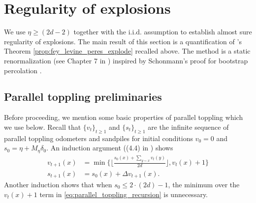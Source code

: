 \documentclass[aap]{imsart}
\newcommand{\Z}{\mathbb{Z}}
\begin{document}






\section{Regularity of explosions} \label{sec:fast_explosions}
We use $\eta \geq (2 d- 2)$ together with the i.i.d. assumption to establish almost sure regularity of explosions. 
The main result of this section is a quantification of \cite{fey2010growth}'s Theorem \ref{prop:fey_levine_peres_explode} recalled above. 
The method is a static renormalization (see Chapter 7 in \cite{grimmett2013percolation}) inspired by Schonmann's proof for bootstrap percolation \cite{schonmann1992behavior}. 



\subsection{Parallel toppling preliminaries}
Before proceeding, we mention some basic properties of parallel toppling which we use below. Recall that $\{v_t\}_{t }$ and $\{s_t\}_{t }$ are the infinite sequence of parallel toppling odometers and sandpiles for initial conditions $v_0 = 0$ and  $s_0 = \eta + M_{\eta}  \delta_0$.
An induction argument ((4.4) in \cite{babai2007sandpile}) shows
\begin{equation} \label{eq:parallel_toppling_recursion}
\begin{aligned}
v_{t+1}(x) &= \min \{ \lfloor \frac{ s_0(x) + \sum_{y \sim x} v_{t}(y)}{2 d} \rfloor, v_t(x) + 1\} \\
s_{t+1}(x) &= s_0(x) + \Delta v_{t+1}(x).
\end{aligned}
\end{equation}
Another induction shows that when $s_0  \cdot (2 d) - 1$, the minimum over the $v_t(x) + 1$ term in  \eqref{eq:parallel_toppling_recursion}
is unnecessary. 
\end{document}
